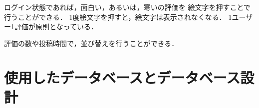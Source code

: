 \documentclass[a4paper,dvipdfmx,11pt]{jsreport}
\begin{document}
ログイン状態であれば，面白い，あるいは，寒いの評価を
絵文字を押すことで行うことができる．
1度絵文字を押すと，絵文字は表示されなくなる．
1ユーザー1評価が原則となっている．

評価の数や投稿時間で，並び替えを行うことができる．

\section{使用したデータベースとデータベース設計}

\renewcommand{\bibname}{参考文献}


\end{document}
